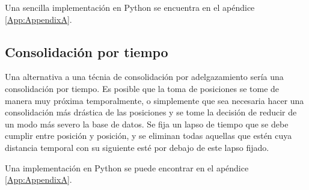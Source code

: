\documentclass[a4paper, 12pt, spanish]{article}
\begin{document}
\begin{algorithm}[H]\label{consolidationByEachSomeNumber}
\begin{algorithmic}[1]
			\EndFor
		\EndIf
	\EndFor
\EndFunction
\end{algorithmic}
\caption{\label{alg:consolidationByThinning} Algoritmo de consolidaci\'on por adelgazamiento}
\end{algorithm}

Una sencilla implementaci\'on en Python se encuentra en el ap\'endice \ref{App:AppendixA}.\\
\pagebreak
\subsection{Consolidaci\'on por tiempo}

Una alternativa a una t\'ecnia de consolidaci\'on por adelgazamiento ser\'ia una consolidaci\'on por tiempo. Es posible que la toma de posiciones se tome de manera muy pr\'oxima temporalmente, o simplemente que sea necesaria hacer una consolidaci\'on m\'as dr\'astica de las posiciones y se tome la decisi\'on de reducir de un modo m\'as severo la base de datos. Se fija un lapso de tiempo que se debe cumplir entre posici\'on y posici\'on, y se eliminan todas aquellas que est\'en cuya distancia temporal con su siguiente est\'e por debajo de este lapso fijado.\\


\begin{algorithm}[H]\label{consolidationByTime}
\begin{algorithmic}[1]
		\EndIf
	\EndFor
\EndFunction
\State{}
	\Else
	\EndIf
\EndFunction
\end{algorithmic}
\caption{\label{alg:consolidationByTime} Algoritmo de consolidaci\'on por tiempo}
\end{algorithm}

Una implementaci\'on en Python se puede encontrar en el ap\'endice \ref{App:AppendixA}.\\
\end{document}
